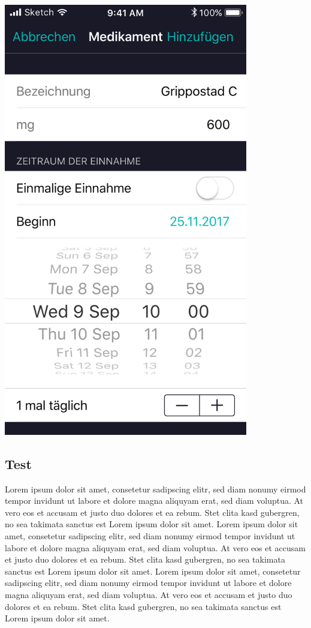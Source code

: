 \documentclass[a4paper]{scrreprt}
\begin{document}
\begin{minipage}[t][][b]{0.45\textwidth}
\includegraphics[width=0.8\textwidth]{mockups/NewMed}
\begin{flushleft}
\end{flushleft}

\end{minipage}%
\hfill
\begin{minipage}[t][][b]{0.45\textwidth}
\subsection{Test}
Lorem ipsum dolor sit amet, consetetur sadipscing elitr, sed diam nonumy eirmod tempor invidunt ut labore et dolore magna aliquyam erat, sed diam voluptua. At vero eos et accusam et justo duo dolores et ea rebum. Stet clita kasd gubergren, no sea takimata sanctus est Lorem ipsum dolor sit amet. Lorem ipsum dolor sit amet, consetetur sadipscing elitr,  sed diam nonumy eirmod tempor invidunt ut labore et dolore magna aliquyam erat, sed diam voluptua. At vero eos et accusam et justo duo dolores et ea rebum. Stet clita kasd gubergren, no sea takimata sanctus est Lorem ipsum dolor sit amet. Lorem ipsum dolor sit amet, consetetur sadipscing elitr,  sed diam nonumy eirmod tempor invidunt ut labore et dolore magna aliquyam erat, sed diam voluptua. At vero eos et accusam et justo duo dolores et ea rebum. Stet clita kasd gubergren, no sea takimata sanctus est Lorem ipsum dolor sit amet.
\end{minipage}%
\end{document}
